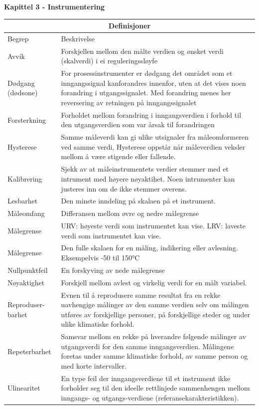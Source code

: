 \documentclass[10pt,a5paper]{article}
\begin{document}
\vskip 5pt


\vfil \eject
\textbf{Kapittel 3 - Instrumentering}

\begin{center}
\begin{longtable}{ | m{2cm} | m{7cm} | } 
\hline
\multicolumn{2}{|c|}{Definisjoner} \\
\hline
Begrep	& Beskrivelse \\ 
\hline
\hline
	Avvik&Forskjellen mellom den målte verdien og ønsket verdi (skalverdi) i ei reguleringssløyfe\\
	\hline
	Dødgang (dødsone)&For prosessinstrumenter er dødgang det området som et inngangssignal kanforandres innenfor, uten at det vises noen forandring i utgangssignalet. Med forandring menes her reversering av retningen på inngangssignalet\\
	\hline
	Forsterkning&Forholdet mellom forandring i inngangsverdien i forhold til den utgangsverdien som var årsak til forandringen\\
	\hline
	Hysterese&Samme måleverdi kan gi ulike utsignaler fra måleomformeren ved samme verdi, Hysterese oppstår når måleverdien veksler mellom å være stigende eller fallende.\\
	\hline
	Kalibrering&Sjekk av at måleinstrumentets verdier stemmer med et intrument med høyere nøyaktihet. Noen intrumenter kan justeres inn om de ikke stemmer overens.\\ 
	\hline
	Lesbarhet&Den minste inndeling på skalaen på et instrument.\\
	\hline
	Måleomfang&Differansen mellom øvre og nedre målegrense\\
	\hline
	Målegrense&URV: høyeste verdi som instrumentet kan vise. LRV: laveste verdi som instrumentet kan vise. \\
	\hline
	Målegrense&Den fulle skalaen for en måling, indikering eller avlesning. Eksempelvis -50 til 150°C\\
	\hline
	Nullpunktfeil&En forskyving av nede målegrense\\
	\hline
	Nøyaktighet& Forskjell mellom avlest og virkelig verdi for en målt variabel.\\
	\hline

	Reproduser- barhet& Evnen til å reprodusere samme resultat fra en rekke uavhengige målinger av den samme verdien selv om målingen utføres av forskjellige personer, på forskjellige steder og under ulike klimatiske forhold.\\
	\hline
	Repeterbarhet&Samsvar mellom en rekke på hverandre følgende målinger av utgangsverdi for den samme inngangsverdien. Målingene foretas under samme klimatiske forhold, av samme person og med korte intervaller.\\
	\hline
	Ulinearitet&En type feil der inngangsverdiene til et instrument ikke forholder seg til den ideelle rettlinjede sammenhengen mellom inngangs- og utgangs-verdiene (referansekarakteristikken).\\
	\hline


\end{longtable}
\end{center}
\end{document}
